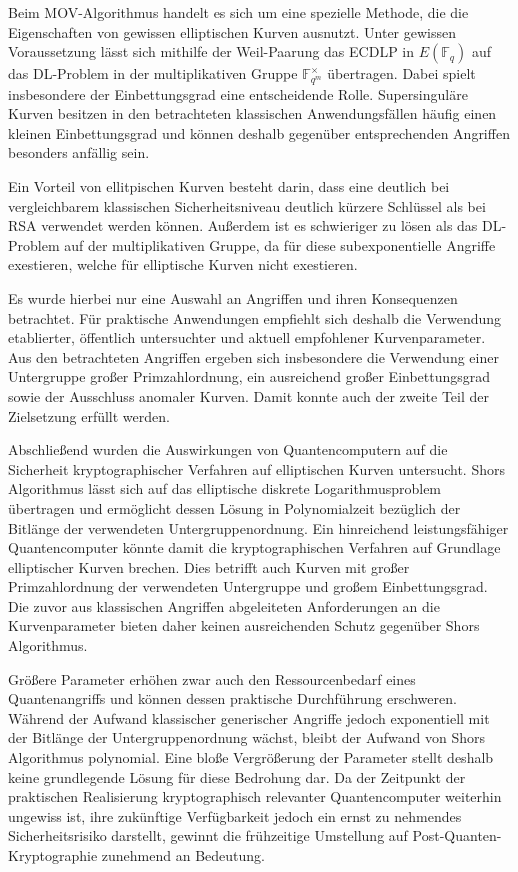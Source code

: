 Beim MOV-Algorithmus handelt es sich um eine spezielle Methode, die die Eigenschaften von gewissen elliptischen Kurven ausnutzt. Unter gewissen Voraussetzung lässt sich mithilfe der Weil-Paarung das ECDLP in  $E(\mathbb{F}_q)$ auf das DL-Problem in der multiplikativen Gruppe $\mathbb{F}_{q^m}^\times$ übertragen. Dabei spielt insbesondere der Einbettungsgrad eine entscheidende Rolle. Supersinguläre Kurven besitzen in den betrachteten klassischen Anwendungsfällen häufig einen kleinen Einbettungsgrad und können deshalb gegenüber entsprechenden Angriffen besonders anfällig sein.

Ein Vorteil von ellitpischen Kurven besteht darin, dass eine deutlich bei vergleichbarem klassischen Sicherheitsniveau deutlich kürzere Schlüssel als bei RSA verwendet werden können. Außerdem ist es schwieriger zu lösen als das DL-Problem auf der multiplikativen Gruppe, da für diese subexponentielle Angriffe exestieren, welche für elliptische Kurven nicht exestieren.

Es wurde hierbei nur eine Auswahl an Angriffen und ihren Konsequenzen betrachtet. Für praktische Anwendungen empfiehlt sich deshalb die Verwendung etablierter, öffentlich untersuchter und aktuell empfohlener Kurvenparameter. Aus den betrachteten Angriffen ergeben sich insbesondere die Verwendung einer Untergruppe großer Primzahlordnung, ein ausreichend großer Einbettungsgrad sowie der Ausschluss anomaler Kurven. Damit konnte auch der zweite Teil der Zielsetzung erfüllt werden.

Abschließend wurden die Auswirkungen von Quantencomputern auf die Sicherheit kryptographischer Verfahren auf elliptischen Kurven untersucht. Shors Algorithmus lässt sich auf das elliptische diskrete Logarithmusproblem übertragen und ermöglicht dessen Lösung in Polynomialzeit bezüglich der Bitlänge der verwendeten Untergruppenordnung. Ein hinreichend leistungsfähiger Quantencomputer könnte damit die kryptographischen Verfahren auf Grundlage elliptischer Kurven brechen. Dies betrifft auch Kurven mit großer Primzahlordnung der verwendeten Untergruppe und großem Einbettungsgrad. Die zuvor aus klassischen Angriffen abgeleiteten Anforderungen an die Kurvenparameter bieten daher keinen ausreichenden Schutz gegenüber Shors Algorithmus.


Größere Parameter erhöhen zwar auch den Ressourcenbedarf eines Quantenangriffs und können dessen praktische Durchführung erschweren. Während der Aufwand klassischer generischer Angriffe jedoch exponentiell mit der Bitlänge der Untergruppenordnung wächst, bleibt der Aufwand von Shors Algorithmus polynomial. Eine bloße Vergrößerung der Parameter stellt deshalb keine grundlegende Lösung für diese Bedrohung dar. Da der Zeitpunkt der praktischen Realisierung kryptographisch relevanter Quantencomputer weiterhin ungewiss ist, ihre zukünftige Verfügbarkeit jedoch ein ernst zu nehmendes Sicherheitsrisiko darstellt, gewinnt die frühzeitige Umstellung auf Post-Quanten-Kryptographie zunehmend an Bedeutung.

